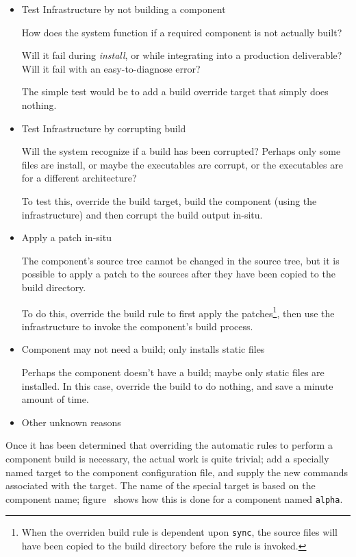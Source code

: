 \begin{itemize}
\item Test \bni Infrastructure by not building a component

  How does the \bni system function if a required component is not
  actually built?

  Will it fail during \emph{install}, or while integrating into a
  production deliverable?  Will it fail with an easy-to-diagnose
  error?

  The simple test would be to add a build override target that simply
  does nothing.

\item Test \bni Infrastructure by corrupting build

  Will the \bni system recognize if a build has been corrupted?
  Perhaps only some files are install, or maybe the executables are
  corrupt, or the executables are for a different architecture?

  To test this, override the build target, build the component (using
  the \lmsbw infrastructure) and then corrupt the build output
  in-situ.

\item Apply a patch in-situ

  The component's source tree cannot be changed in the source tree,
  but it is possible to apply a patch to the sources after they have
  been copied to the build directory.

  To do this, override the build rule to first apply the
  patches\footnote{When the overriden build rule is dependent upon
    \texttt{sync}, the source files will have been copied to the build
    directory before the rule is invoked.}, then use the \lmsbw
  infrastructure to invoke the component's build process.

\item Component may not need a build; only installs static files

  Perhaps the component doesn't have a build; maybe only static files
  are installed.  In this case, override the build to do nothing, and
  save a minute amount of time.

\item Other unknown reasons
\end{itemize}

Once it has been determined that overriding the automatic rules to
perform a component build is necessary, the actual work is quite
trivial; add a specially named \makefile target to the component
configuration file, and supply the new commands associated with the
target.  The name of the special target is based on the component
name; figure~ shows how this
is done for a component named \texttt{alpha}.

